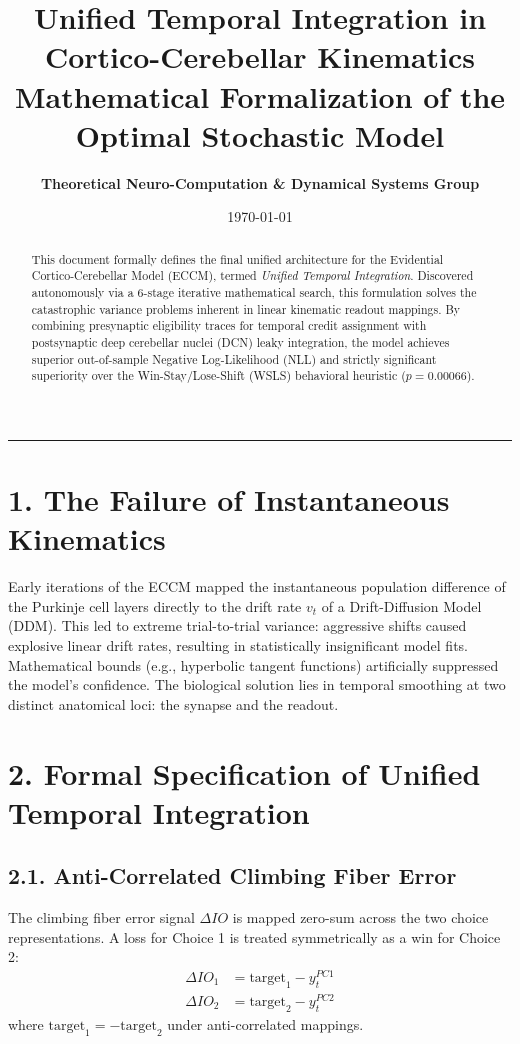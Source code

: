\documentclass[11pt,twoside,a4paper]{article}
\title{\Huge \textbf{\color{navyblue} Unified Temporal Integration in Cortico-Cerebellar Kinematics}\\[0.4em]
\Large \textbf{Mathematical Formalization of the Optimal Stochastic Model}}
\author{\textbf{Theoretical Neuro-Computation \& Dynamical Systems Group}}
\date{\today}
\begin{document}
\maketitle

\begin{abstract}
This document formally defines the final unified architecture for the Evidential Cortico-Cerebellar Model (ECCM), termed \textit{Unified Temporal Integration}. Discovered autonomously via a 6-stage iterative mathematical search, this formulation solves the catastrophic variance problems inherent in linear kinematic readout mappings. By combining presynaptic eligibility traces for temporal credit assignment with postsynaptic deep cerebellar nuclei (DCN) leaky integration, the model achieves superior out-of-sample Negative Log-Likelihood (NLL) and strictly significant superiority over the Win-Stay/Lose-Shift (WSLS) behavioral heuristic ($p = 0.00066$).
\end{abstract}

\vspace{0.8em}
\hrule
\vspace{0.8em}

\section{1. The Failure of Instantaneous Kinematics}
Early iterations of the ECCM mapped the instantaneous population difference of the Purkinje cell layers directly to the drift rate $v_t$ of a Drift-Diffusion Model (DDM). This led to extreme trial-to-trial variance: aggressive shifts caused explosive linear drift rates, resulting in statistically insignificant model fits. Mathematical bounds (e.g., hyperbolic tangent functions) artificially suppressed the model's confidence. The biological solution lies in temporal smoothing at two distinct anatomical loci: the synapse and the readout.

\section{2. Formal Specification of Unified Temporal Integration}

\subsection{2.1. Anti-Correlated Climbing Fiber Error}
The climbing fiber error signal $\Delta IO$ is mapped zero-sum across the two choice representations. A loss for Choice 1 is treated symmetrically as a win for Choice 2:
\begin{align}
    \Delta IO_1 &= \text{target}_1 - y^{PC1}_t \\
    \Delta IO_2 &= \text{target}_2 - y^{PC2}_t
\end{align}
where $\text{target}_1 = -\text{target}_2$ under anti-correlated mappings.
\end{document}
